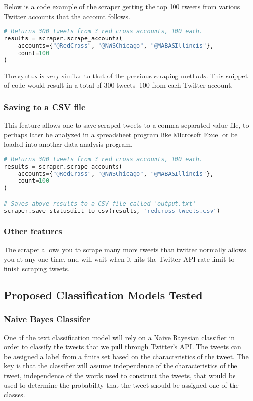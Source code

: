 \documentclass[titlepage, 12pt]{article}
\begin{document}
Below is a code example of the scraper getting the top 100 tweets from various Twitter accounts that the  \@RedCross account follows.

\begin{lstlisting}[language=Python,caption=Scraping by account]
# Returns 300 tweets from 3 red cross accounts, 100 each.
results = scraper.scrape_accounts(
    accounts={"@RedCross", "@NWSChicago", "@MABASIllinois"},
    count=100
)
\end{lstlisting}

The syntax is very similar to that of the previous scraping methods. This snippet of code would result in a total of 300 tweets, 100 from each Twitter account.

\newpage

\subsubsection{Saving to a CSV file}

This feature allows one to save scraped tweets to a comma-separated value file, to perhaps later be analyzed in a spreadsheet program like Microsoft Excel or be loaded into another data analysis program.

\begin{lstlisting}[language=Python,caption=Saving to CSV]
# Returns 300 tweets from 3 red cross accounts, 100 each.
results = scraper.scrape_accounts(
    accounts={"@RedCross", "@NWSChicago", "@MABASIllinois"},
    count=100
)

# Saves above results to a CSV file called 'output.txt'
scraper.save_statusdict_to_csv(results, 'redcross_tweets.csv')
\end{lstlisting}

\subsubsection{Other features}

The scraper allows you to scrape many more tweets than twitter normally allows you at any one time, and will wait when it hits the Twitter API rate limit to finish scraping tweets.

\subsection{Proposed Classification Models Tested}
\subsubsection{Naive Bayes Classifer}
\hspace{0.5 cm}One of the text classification model will rely on a Naive Bayesian classifier in order to classify the tweets that we pull through Twitter's API. The tweets can be assigned a label from a finite set based on the characteristics of the tweet. The key is that the classifier will assume independence of the characteristics of the tweet, independence of the words used to construct the tweets, that would be used to determine the probability that the tweet should be assigned one of the classes.
\end{document}
